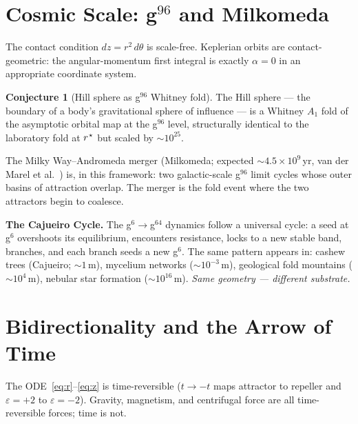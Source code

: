 \documentclass[12pt,a4paper]{article}
\theoremstyle{plain}
\theoremstyle{definition}
\newtheorem{conjecture}[theorem]{Conjecture}
\theoremstyle{remark}
\newcommand{\eps}{\varepsilon}
\newcommand{\rstar}{r^{\kern0.5pt\star}}
\begin{document}
\section{Cosmic Scale: g$^{96}$ and Milkomeda}
\label{sec:milkomeda}

The contact condition $dz=r^2\,d\theta$ is scale-free.
Keplerian orbits are contact-geometric: the angular-momentum first integral is
exactly $\alpha=0$ in an appropriate coordinate system.

\begin{conjecture}[Hill sphere as g$^{96}$ Whitney fold]
The Hill sphere — the boundary of a body's gravitational sphere of influence — is
a Whitney $A_1$ fold of the asymptotic orbital map at the g$^{96}$ level,
structurally identical to the laboratory fold at $\rstar$ but scaled by $\sim10^{25}$.
\end{conjecture}

The Milky Way--Andromeda merger (Milkomeda; expected $\sim4.5\times10^9$\,yr,
van der Marel et al.~\cite{vanderMarel2012}) is, in this framework:
two galactic-scale g$^{96}$ limit cycles whose outer basins of attraction overlap.
The merger is the fold event where the two attractors begin to coalesce.

\medskip\noindent\textbf{The Cajueiro Cycle.}
The g$^6\to$g$^{64}$ dynamics follow a universal cycle: a seed at g$^6$ overshoots
its equilibrium, encounters resistance, locks to a new stable band, branches, and
each branch seeds a new g$^6$.
The same pattern appears in:
cashew trees (Cajueiro; $\sim1$\,m), mycelium networks ($\sim10^{-3}$\,m),
geological fold mountains ($\sim10^4$\,m), nebular star formation ($\sim10^{16}$\,m).
\emph{Same geometry — different substrate.}

\section{Bidirectionality and the Arrow of Time}
\label{sec:bidir}

The ODE~\eqref{eq:r}--\eqref{eq:z} is time-reversible ($t\to-t$ maps attractor to
repeller and $\eps=+2$ to $\eps=-2$).
Gravity, magnetism, and centrifugal force are all time-reversible forces; time is
not.
\end{document}
